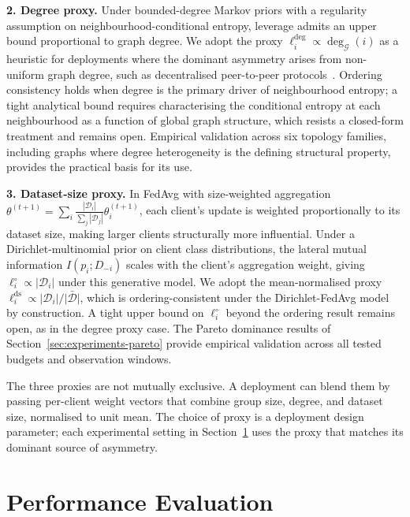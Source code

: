 \documentclass[letterpaper,journal]{IEEEtran}
\begin{document}
\noindent\textbf{2. Degree proxy.} Under bounded-degree Markov
priors with a regularity assumption on neighbourhood-conditional
entropy, leverage admits an upper bound proportional to graph
degree. We adopt the proxy $\ell_i^{\mathrm{deg}} \propto
\deg_{\mathcal{G}}(i)$ as a heuristic for deployments where the
dominant asymmetry arises from non-uniform graph degree, such as
decentralised peer-to-peer
protocols~\cite{roy2019braintorrent,hegedus2021decentralized,beilharz2021dag}.
Ordering consistency holds when degree is the primary driver of
neighbourhood entropy; a tight analytical bound requires
characterising the conditional entropy at each neighbourhood as a
function of global graph structure, which resists a closed-form
treatment and remains open. Empirical validation across six topology
families, including graphs where degree heterogeneity is
the defining structural property, provides the practical basis for
its use.\smallskip

\noindent\textbf{3. Dataset-size proxy.} In FedAvg with
size-weighted aggregation
$\theta^{(t+1)} = \sum_i \frac{|\mathcal{D}_i|}{\sum_j
|\mathcal{D}_j|} \theta_i^{(t+1)}$, each client's update is
weighted proportionally to its dataset size, making larger clients
structurally more influential. Under a Dirichlet-multinomial prior
on client class distributions, the lateral mutual information
$I(p_i; D_{-i})$ scales with the client's aggregation weight,
giving $\ell_i^\circ \propto |\mathcal{D}_i|$ under this generative
model. We adopt the mean-normalised proxy $\ell_i^{\mathrm{ds}}
\propto |\mathcal{D}_i|/\bar{|\mathcal{D}|}$, which is
ordering-consistent under the Dirichlet-FedAvg model by
construction. A tight upper bound on $\ell_i^\circ$ beyond the
ordering result remains open, as in the degree proxy case. The
Pareto dominance results of
Section~\ref{sec:experiments-pareto} provide empirical validation
across all tested budgets and observation windows.\smallskip

\noindent The three proxies are not mutually exclusive. A deployment
can blend them by passing per-client weight vectors that combine
group size, degree, and dataset size, normalised to unit mean. The
choice of proxy is a deployment design parameter; each experimental
setting in Section~\ref{sec:experiments} uses the proxy that matches
its dominant source of asymmetry.
\section{Performance Evaluation}
\label{sec:experiments}
\end{document}
